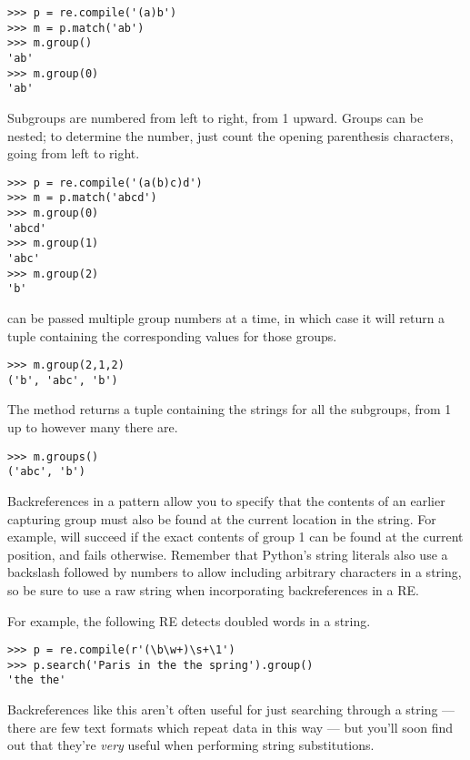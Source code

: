 \documentclass{howto}
\begin{document}
\begin{verbatim}
>>> p = re.compile('(a)b')
>>> m = p.match('ab')
>>> m.group()
'ab'
>>> m.group(0)
'ab'
\end{verbatim}

Subgroups are numbered from left to right, from 1 upward.  Groups can
be nested; to determine the number, just count the opening parenthesis
characters, going from left to right.

\begin{verbatim}
>>> p = re.compile('(a(b)c)d')
>>> m = p.match('abcd')
>>> m.group(0)
'abcd'
>>> m.group(1)
'abc'
>>> m.group(2)
'b'
\end{verbatim}

 can be passed multiple group numbers at a time, in
which case it will return a tuple containing the corresponding values
for those groups.

\begin{verbatim}  
>>> m.group(2,1,2)
('b', 'abc', 'b')
\end{verbatim}  

The  method returns a tuple containing the strings
for all the subgroups, from 1 up to however many there are.

\begin{verbatim}  
>>> m.groups()
('abc', 'b')
\end{verbatim}  

Backreferences in a pattern allow you to specify that the contents of
an earlier capturing group must also be found at the current location
in the string.  For example,  will succeed if the exact
contents of group 1 can be found at the current position, and fails
otherwise.  Remember that Python's string literals also use a
backslash followed by numbers to allow including arbitrary characters
in a string, so be sure to use a raw string when incorporating
backreferences in a RE.

For example, the following RE detects doubled words in a string.

\begin{verbatim}
>>> p = re.compile(r'(\b\w+)\s+\1')
>>> p.search('Paris in the the spring').group()
'the the'
\end{verbatim}

Backreferences like this aren't often useful for just searching
through a string --- there are few text formats which repeat data in
this way --- but you'll soon find out that they're \emph{very} useful
when performing string substitutions.
\end{document}
